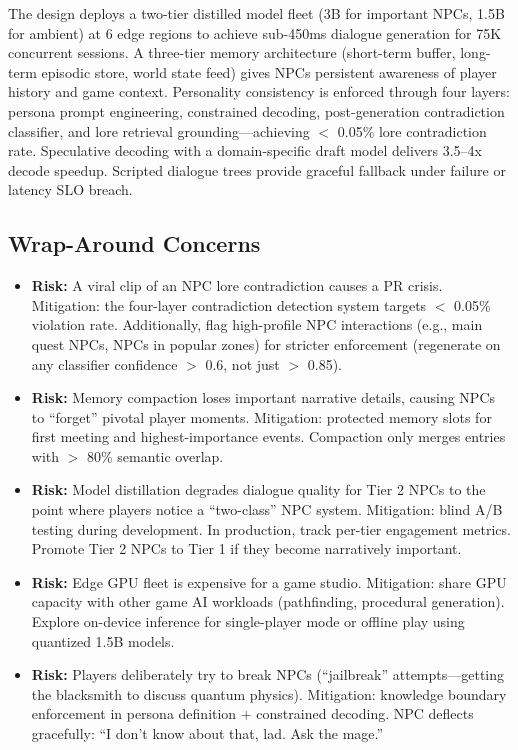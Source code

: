 The design deploys a two-tier distilled model fleet (3B for important NPCs, 1.5B for ambient) at 6 edge regions to achieve sub-450ms dialogue generation for 75K concurrent sessions. A three-tier memory architecture (short-term buffer, long-term episodic store, world state feed) gives NPCs persistent awareness of player history and game context. Personality consistency is enforced through four layers: persona prompt engineering, constrained decoding, post-generation contradiction classifier, and lore retrieval grounding---achieving $<$ 0.05\% lore contradiction rate. Speculative decoding with a domain-specific draft model delivers 3.5--4x decode speedup. Scripted dialogue trees provide graceful fallback under failure or latency SLO breach.

\subsection*{Wrap-Around Concerns}
\begin{itemize}
  \item \textbf{Risk:} A viral clip of an NPC lore contradiction causes a PR crisis. Mitigation: the four-layer contradiction detection system targets $<$ 0.05\% violation rate. Additionally, flag high-profile NPC interactions (e.g., main quest NPCs, NPCs in popular zones) for stricter enforcement (regenerate on any classifier confidence $>$ 0.6, not just $>$ 0.85).
  \item \textbf{Risk:} Memory compaction loses important narrative details, causing NPCs to ``forget'' pivotal player moments. Mitigation: protected memory slots for first meeting and highest-importance events. Compaction only merges entries with $>$ 80\% semantic overlap.
  \item \textbf{Risk:} Model distillation degrades dialogue quality for Tier 2 NPCs to the point where players notice a ``two-class'' NPC system. Mitigation: blind A/B testing during development. In production, track per-tier engagement metrics. Promote Tier 2 NPCs to Tier 1 if they become narratively important.
  \item \textbf{Risk:} Edge GPU fleet is expensive for a game studio. Mitigation: share GPU capacity with other game AI workloads (pathfinding, procedural generation). Explore on-device inference for single-player mode or offline play using quantized 1.5B models.
  \item \textbf{Risk:} Players deliberately try to break NPCs (``jailbreak'' attempts---getting the blacksmith to discuss quantum physics). Mitigation: knowledge boundary enforcement in persona definition + constrained decoding. NPC deflects gracefully: ``I don't know about that, lad. Ask the mage.''
\end{itemize}

